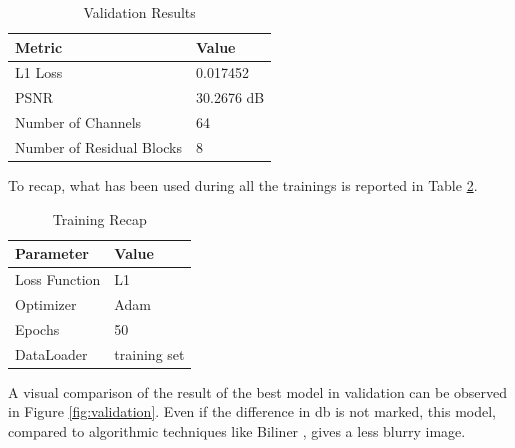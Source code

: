 \documentclass[../report.tex]{subfiles}
\begin{document}
\begin{table}[h]
	\centering
	\caption{Validation Results}
	\begin{tabular}{@{}ll@{}}
		\toprule
		\textbf{Metric}            & \textbf{Value} \\ \midrule
		L1 Loss                    & 0.017452 \\ 
		PSNR                       & 30.2676 dB \\ 
		Number of Channels         & 64 \\ 
		Number of Residual Blocks  & 8 \\ 
		\bottomrule
	\end{tabular}
	\label{tab:validation_results}
\end{table}
To recap, what has been used during all the trainings is reported in Table \ref{tab:training_recap}.
\begin{table}[]
	\centering
	\caption{Training Recap}
	\begin{tabular}{@{}ll@{}}
		\toprule
		\textbf{Parameter}       & \textbf{Value} \\ \midrule
		Loss Function            & L1 \\ 
		Optimizer                & Adam \\ 
		Epochs                   & 50 \\ 
		DataLoader      & training set\\
		\bottomrule
	\end{tabular}
	\label{tab:training_recap}
\end{table}
A visual comparison of the result of the best model in validation can be observed in Figure \ref{fig:validation}. Even if the difference in db is not marked, this model, compared to algorithmic techniques like Biliner , gives a less blurry image. 
\end{document}
